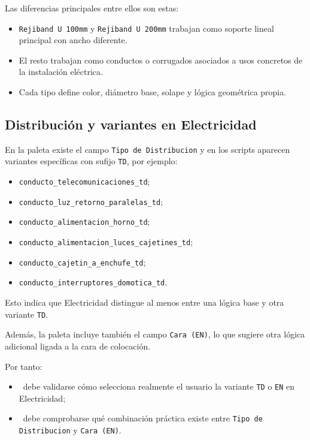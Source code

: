 Las diferencias principales entre ellos son estas:

\begin{itemize}
\item \texttt{Rejiband U 100mm} y \texttt{Rejiband U 200mm} trabajan como soporte lineal principal con ancho diferente.
\item El resto trabajan como conductos o corrugados asociados a usos concretos de la instalación eléctrica.
\item Cada tipo define color, diámetro base, solape y lógica geométrica propia.
\end{itemize}


\subsection{Distribución y variantes en Electricidad}

En la paleta existe el campo \texttt{Tipo de Distribucion} y en los scripts aparecen variantes específicas con sufijo \texttt{TD}, por ejemplo:

\begin{itemize}
\item \texttt{conducto\_telecomunicaciones\_td};
\item \texttt{conducto\_luz\_retorno\_paralelas\_td};
\item \texttt{conducto\_alimentacion\_horno\_td};
\item \texttt{conducto\_alimentacion\_luces\_cajetines\_td};
\item \texttt{conducto\_cajetin\_a\_enchufe\_td};
\item \texttt{conducto\_interruptores\_domotica\_td}.
\end{itemize}

Esto indica que Electricidad distingue al menos entre una lógica base y otra variante \texttt{TD}.

Además, la paleta incluye también el campo \texttt{Cara (EN)}, lo que sugiere otra lógica adicional ligada a la cara de colocación.

Por tanto:

\begin{itemize}
\item \pendingtag\ debe validarse cómo selecciona realmente el usuario la variante \texttt{TD} o \texttt{EN} en Electricidad;
\item \pendingtag\ debe comprobarse qué combinación práctica existe entre \texttt{Tipo de Distribucion} y \texttt{Cara (EN)}.
\end{itemize}

